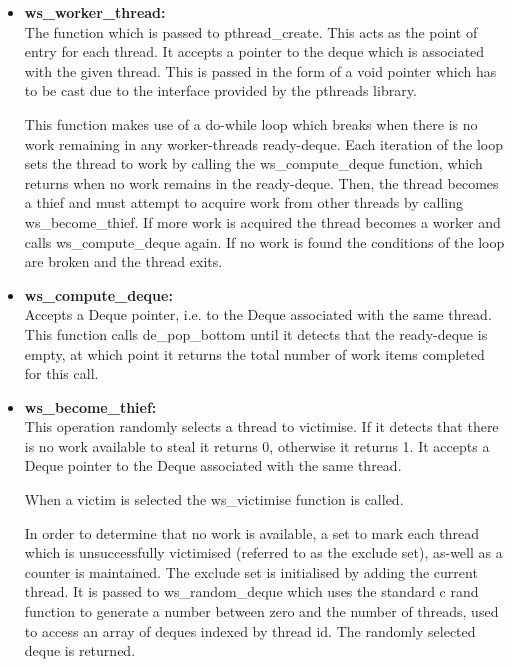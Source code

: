 
\begin{itemize}
\item \textbf{ws\_worker\_thread: } \\
                The function which is passed to pthread\_create. This acts as the point of entry for each \gls{thread}.
                It accepts a pointer to the deque which is associated with the given thread. This is passed 
                in the form of a void pointer which has to be cast due to the interface provided by the pthreads
                library.
              
                This function makes use of a do-while loop which breaks when there is no work remaining in any \glspl{worker-thread} \gls{ready-deque}. 
                Each iteration of the loop sets the thread to work by calling the ws\_compute\_deque function, which returns when 
                no work remains in the \gls{ready-deque}. Then, the thread becomes a \gls{thief} and must attempt to acquire work
                from other threads by calling ws\_become\_thief. If more work is acquired the thread becomes a worker and calls ws\_compute\_deque
                again. If no work is found the conditions of the loop are broken and the thread exits.
              
\item \textbf{ws\_compute\_deque: } \\
                Accepts a Deque pointer, i.e. to the Deque associated with the same thread. This function 
                calls de\_pop\_bottom until it detects that the ready-deque is empty, at which point it returns
                the total number of work items completed for this call.
                
\item \textbf{ws\_become\_thief: } \\
                This operation randomly selects a thread to victimise. If it detects that there is no work
                available to steal it returns 0, otherwise it returns 1.
                It accepts a Deque pointer to the Deque associated with the same thread. 
                
                When a victim is selected the ws\_victimise function is called.
                
                In order to determine that no work is available, a set to mark each thread which is unsuccessfully victimised (referred to as
                the exclude set), as-well as a counter is maintained.
                The exclude set is initialised by adding the current thread. It is passed to ws\_random\_deque which
                uses the standard c rand function to generate a number between zero and the number of threads, used to access an array 
                of deques indexed by thread id. The randomly selected deque is returned.
                

\end{itemize}
